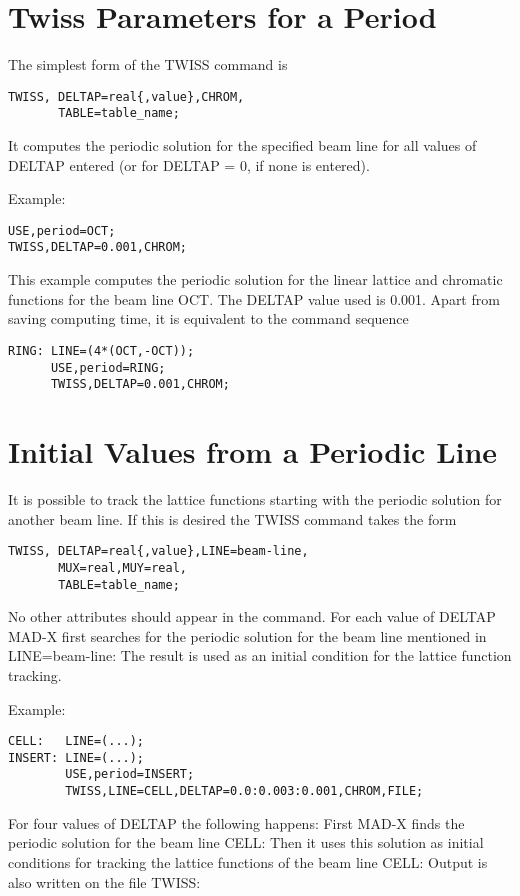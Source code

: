 \section{Twiss Parameters for a Period}

The simplest form of the TWISS command is 
\begin{verbatim}
TWISS, DELTAP=real{,value},CHROM,
       TABLE=table_name;
\end{verbatim}

It computes the periodic solution for the specified beam line for all
values of DELTAP entered (or for DELTAP = 0, if none is entered).  

Example: 
\begin{verbatim}
USE,period=OCT;
TWISS,DELTAP=0.001,CHROM;
\end{verbatim}

This example computes the periodic solution for the linear lattice and
chromatic functions for the beam line OCT. The DELTAP value used is
0.001. Apart from saving computing time, it is equivalent to the command
sequence  
\begin{verbatim}
RING: LINE=(4*(OCT,-OCT));
      USE,period=RING;
      TWISS,DELTAP=0.001,CHROM;
\end{verbatim}

\section{Initial Values from a Periodic Line}

It is possible to track the lattice functions starting with the periodic
solution for another beam line. If this is desired the TWISS command
takes the form  
\begin{verbatim}
TWISS, DELTAP=real{,value},LINE=beam-line,
       MUX=real,MUY=real,
       TABLE=table_name;
\end{verbatim}

No other attributes should appear in the command. For each value of
DELTAP MAD-X first searches for the periodic solution for the beam line
mentioned in LINE=beam-line: The result is used as an initial condition
for the lattice function tracking. 

Example: 
\begin{verbatim}
CELL:   LINE=(...);
INSERT: LINE=(...);
        USE,period=INSERT;
        TWISS,LINE=CELL,DELTAP=0.0:0.003:0.001,CHROM,FILE;
\end{verbatim}

For four values of DELTAP the following happens: First MAD-X finds the
periodic solution for the beam line CELL: Then it uses this solution as
initial conditions for tracking the lattice functions of the beam line
CELL: Output is also written on the file TWISS:  

